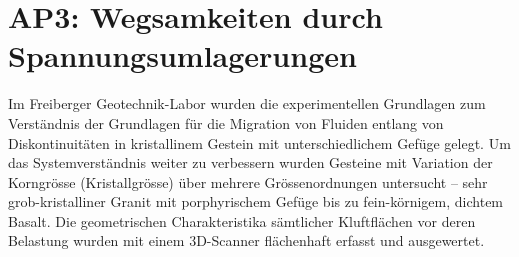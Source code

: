 \section*{AP3: Wegsamkeiten durch Spannungsumlagerungen}
\label{sec:wp3}

Im Freiberger Geotechnik-Labor wurden die experimentellen Grundlagen zum Verständnis der Grundlagen für die Migration von Fluiden entlang von Diskontinuitäten in kristallinem Gestein mit unterschiedlichem Gefüge gelegt.
Um das Systemverständnis weiter zu verbessern wurden Gesteine mit Variation der Korngrösse (Kristallgrösse) über mehrere Grössenordnungen untersucht -- sehr grob-kristalliner Granit mit porphyrischem Gefüge bis zu fein-körnigem, dichtem Basalt. Die geometrischen Charakteristika sämtlicher Kluftflächen vor deren Belastung wurden mit einem 3D-Scanner flächenhaft erfasst und ausgewertet. 

